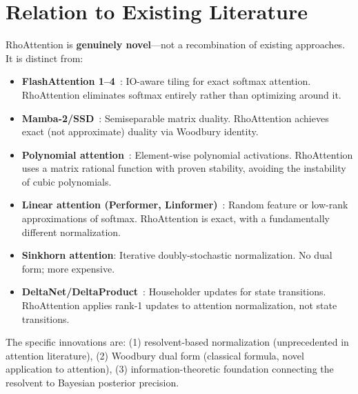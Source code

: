 \documentclass[11pt,a4paper]{article}
\theoremstyle{remark}
\begin{document}
\section{Relation to Existing Literature}

RhoAttention is \textbf{genuinely novel}---not a recombination of existing approaches. It is distinct from:
\begin{itemize}
    \item \textbf{FlashAttention 1--4}~\cite{dao2022flashattention,dao2023flashattention2,shah2024flashattention3,dao2026flashattention4}: IO-aware tiling for exact softmax attention. RhoAttention eliminates softmax entirely rather than optimizing around it.
    \item \textbf{Mamba-2/SSD}~\cite{dao2024transformers}: Semiseparable matrix duality. RhoAttention achieves exact (not approximate) duality via Woodbury identity.
    \item \textbf{Polynomial attention}~\cite{adelaide2024rethinking}: Element-wise polynomial activations. RhoAttention uses a matrix rational function with proven stability, avoiding the instability of cubic polynomials.
    \item \textbf{Linear attention (Performer, Linformer)}~\cite{choromanski2021rethinking,wang2020linformer}: Random feature or low-rank approximations of softmax. RhoAttention is exact, with a fundamentally different normalization.
    \item \textbf{Sinkhorn attention}: Iterative doubly-stochastic normalization. No dual form; more expensive.
    \item \textbf{DeltaNet/DeltaProduct}~\cite{siems2025deltaproduct}: Householder updates for state transitions. RhoAttention applies rank-1 updates to attention normalization, not state transitions.
\end{itemize}

The specific innovations are: (1) resolvent-based normalization (unprecedented in attention literature), (2) Woodbury dual form (classical formula, novel application to attention), (3) information-theoretic foundation connecting the resolvent to Bayesian posterior precision.

\end{document}
